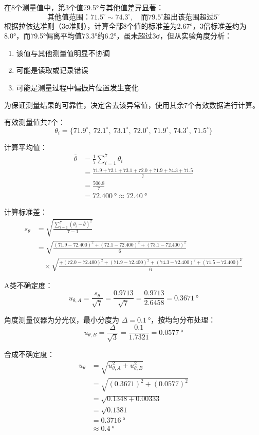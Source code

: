 \documentclass[10pt,a4paper]{ctexart}
\begin{document}
在8个测量值中，第3个值79.5°与其他值差异显著：
\[
\text{其他值范围：} 71.5^\circ \sim 74.3^\circ, \quad \text{而} 79.5^\circ \text{超出该范围超过} 5^\circ
\]
根据拉依达准则（3σ准则），计算全部8个值的标准差为2.67°，3倍标准差约为8.0°，而79.5°偏离平均值73.3°约6.2°，虽未超过3σ，但从实验角度分析：
\begin{enumerate}
    \item 该值与其他测量值明显不协调
    \item 可能是读取或记录错误
    \item 可能是测量过程中偏振片位置发生变化
\end{enumerate}
为保证测量结果的可靠性，决定舍去该异常值，使用其余7个有效数据进行计算。


有效测量值共7个：
\[
\theta_i = \{71.9^\circ,\ 72.1^\circ,\ 73.1^\circ,\ 72.0^\circ,\ 71.9^\circ,\ 74.3^\circ,\ 71.5^\circ\}
\]

计算平均值：
\begin{align*}
\bar{\theta} &= \frac{1}{7} \sum_{i=1}^{7} \theta_i \\
&= \frac{71.9 + 72.1 + 73.1 + 72.0 + 71.9 + 74.3 + 71.5}{7} \\
&= \frac{506.8}{7} \\
&= \SI{72.400}{\degree} \approx \SI{72.40}{\degree}
\end{align*}

计算标准差：
\begin{align*}
s_\theta &= \sqrt{\frac{\sum_{i=1}^{7} (\theta_i - \bar{\theta})^2}{7-1}} \\
&= \sqrt{\frac{(71.9-72.400)^2 + (72.1-72.400)^2 + (73.1-72.400)^2}{6}} \\
&\quad \times \sqrt{\frac{+ (72.0-72.400)^2 + (71.9-72.400)^2 + (74.3-72.400)^2 + (71.5-72.400)^2}{6}}
\end{align*}

A类不确定度：
\[
u_{\theta,A} = \frac{s_\theta}{\sqrt{7}} = \frac{0.9713}{\sqrt{7}} = \frac{0.9713}{2.6458} = \SI{0.3671}{\degree}
\]

角度测量仪器为分光仪，最小分度为 $\Delta = \SI{0.1}{\degree}$，按均匀分布处理：
\[
u_{\theta,B} = \frac{\Delta}{\sqrt{3}} = \frac{0.1}{1.7321} = \SI{0.0577}{\degree}
\]

合成不确定度：
\begin{align*}
u_\theta &= \sqrt{u_{\theta,A}^2 + u_{\theta,B}^2} \\
&= \sqrt{(0.3671)^2 + (0.0577)^2} \\
&= \sqrt{0.1348 + 0.00333} \\
&= \sqrt{0.1381} \\
&= \SI{0.3716}{\degree} \\
&\approx \SI{0.4}{\degree}
\end{align*}
\end{document}
